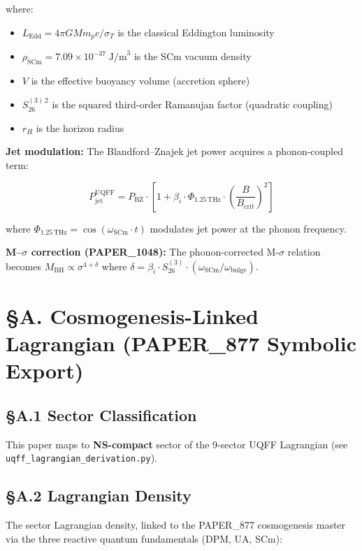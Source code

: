 \documentclass[12pt,a4paper]{article}
\begin{document}
where:

\begin{itemize}
  \item $L_{\text{Edd}} = 4\pi G M m_p c / \sigma_T$ is the classical Eddington luminosity
  \item $\rho_{\text{SCm}} = 7.09 \times 10^{-37}\;\text{J/m}^3$ is the SCm vacuum density
  \item $V$ is the effective buoyancy volume (accretion sphere)
  \item $S_{26}^{(3)\,2}$ is the squared third-order Ramanujan factor (quadratic coupling)
  \item $r_H$ is the horizon radius
\end{itemize}

\textbf{Jet modulation:} The Blandford--Znajek jet power acquires a phonon-coupled term:

\begin{equation}
P_{\text{jet}}^{\text{UQFF}} = P_{\text{BZ}} \cdot \left[1 + \beta_i \cdot \Phi_{1.25\,\text{THz}} \cdot \left(\frac{B}{B_{\text{crit}}}\right)^2\right]
\end{equation}

where $\Phi_{1.25\,\text{THz}} = \cos(\omega_{\text{SCm}} \cdot t)$ modulates jet power at the phonon frequency.

\textbf{M--$\sigma$ correction (PAPER\_1048):} The phonon-corrected M-$\sigma$ relation becomes $M_{\text{BH}} \propto \sigma^{4+\delta}$ where $\delta = \beta_i \cdot S_{26}^{(3)} \cdot (\omega_{\text{SCm}}/\omega_{\text{bulge}})$.

\section{\S{}A. Cosmogenesis-Linked Lagrangian (PAPER\_877 Symbolic Export)}

\subsection{\S{}A.1 Sector Classification}

This paper maps to \textbf{NS-compact} sector of the 9-sector UQFF Lagrangian (see \texttt{uqff\_{lagrangian\_derivation}.py}).

\subsection{\S{}A.2 Lagrangian Density}

The sector Lagrangian density, linked to the PAPER\_877 cosmogenesis master via the three reactive quantum fundamentals (DPM, UA, SCm):
\end{document}
